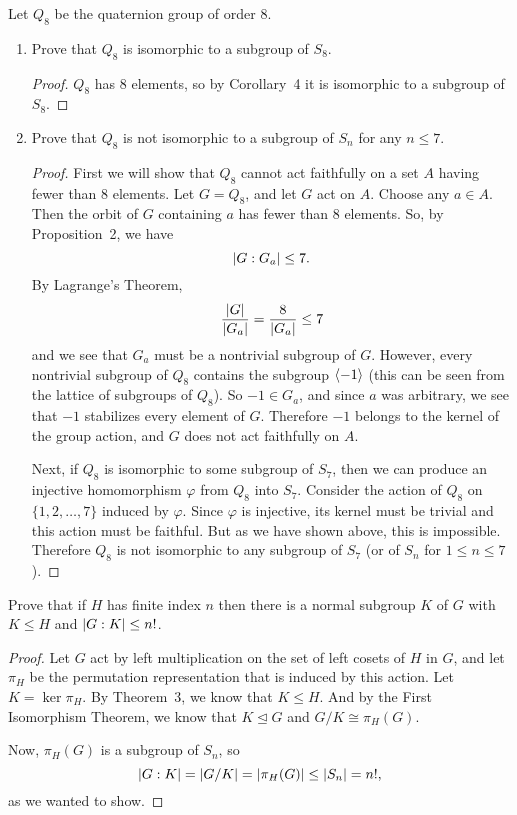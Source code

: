  Let $Q_8$ be the quaternion group of order $8$.
\begin{enumerate}
\item Prove that $Q_8$ is isomorphic to a subgroup of $S_8$.
  \begin{proof}
    $Q_8$ has $8$ elements, so by Corollary~4 it is isomorphic to a
    subgroup of $S_8$.
  \end{proof}

\item Prove that $Q_8$ is not isomorphic to a subgroup of $S_n$ for
  any $n\leq7$.
  \begin{proof}
    First we will show that $Q_8$ cannot act faithfully on a set $A$
    having fewer than $8$ elements. Let $G = Q_8$, and let $G$ act on
    $A$. Choose any $a\in A$. Then the orbit of $G$ containing $a$ has
    fewer than $8$ elements. So, by Proposition~2, we have
    \begin{equation*}
      \lvert{G : G_a}\rvert \leq 7.
    \end{equation*}
    By Lagrange's Theorem,
    \begin{equation*}
      \frac{\lvert{G}\rvert}{\lvert{G_a}\rvert} = \frac8{\lvert{G_a}\rvert} \leq 7
    \end{equation*}
    and we see that $G_a$ must be a nontrivial subgroup of
    $G$. However, every nontrivial subgroup of $Q_8$ contains the
    subgroup $\langle{-1}\rangle$ (this can be seen from the lattice of
    subgroups of $Q_8$). So $-1\in G_a$, and since $a$ was arbitrary,
    we see that $-1$ stabilizes every element of $G$. Therefore $-1$
    belongs to the kernel of the group action, and $G$ does not act
    faithfully on $A$.

    Next, if $Q_8$ is isomorphic to some subgroup of $S_7$, then we
    can produce an injective homomorphism $\varphi$ from $Q_8$ into
    $S_7$. Consider the action of $Q_8$ on $\{1,2,\dots,7\}$ induced
    by $\varphi$. Since $\varphi$ is injective, its kernel must be
    trivial and this action must be faithful. But as we have shown
    above, this is impossible. Therefore $Q_8$ is not isomorphic to
    any subgroup of $S_7$ (or of $S_n$ for $1\leq n\leq7$).
  \end{proof}
\end{enumerate}

 Prove that if $H$ has finite index $n$ then there is a
normal subgroup $K$ of $G$ with $K\leq H$ and $\lvert{G:K}\rvert\leq n!$.
\begin{proof}
  Let $G$ act by left multiplication on the set of left cosets of $H$
  in $G$, and let $\pi_H$ be the permutation representation that is
  induced by this action. Let $K = \ker\pi_H$. By Theorem~3, we know
  that $K\leq H$. And by the First Isomorphism Theorem, we know that
  $K\trianglelefteq G$ and $G/K\cong\pi_H(G)$.

  Now, $\pi_H(G)$ is a subgroup of $S_n$, so
  \begin{equation*}
    \lvert{G:K}\rvert = \lvert{G/K}\rvert = \lvert{\pi_H(G)}\rvert \leq \lvert{S_n}\rvert = n!,
  \end{equation*}
  as we wanted to show.
\end{proof}

